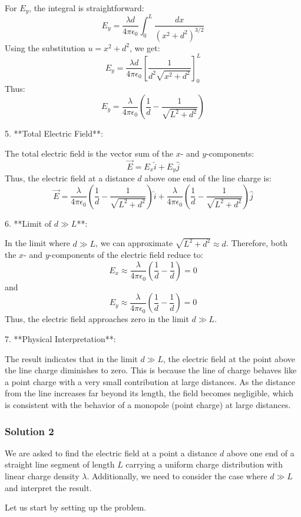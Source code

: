 \documentclass{article}
\begin{document}
For \( E_y \), the integral is straightforward:
\[
E_y = \frac{\lambda d}{4 \pi \epsilon_0} \int_0^L \frac{dx}{(x^2 + d^2)^{3/2}}
\]
Using the substitution \( u = x^2 + d^2 \), we get:
\[
E_y = \frac{\lambda d}{4 \pi \epsilon_0} \left[ \frac{1}{d^2 \sqrt{x^2 + d^2}} \right]_0^L
\]
Thus:
\[
E_y = \frac{\lambda}{4 \pi \epsilon_0} \left( \frac{1}{d} - \frac{1}{\sqrt{L^2 + d^2}} \right)
\]

5. **Total Electric Field**:

The total electric field is the vector sum of the \( x \)- and \( y \)-components:
\[
\vec{E} = E_x \hat{i} + E_y \hat{j}
\]
Thus, the electric field at a distance \( d \) above one end of the line charge is:
\[
\vec{E} = \frac{\lambda}{4 \pi \epsilon_0} \left( \frac{1}{d} - \frac{1}{\sqrt{L^2 + d^2}} \right) \hat{i} + \frac{\lambda}{4 \pi \epsilon_0} \left( \frac{1}{d} - \frac{1}{\sqrt{L^2 + d^2}} \right) \hat{j}
\]

6. **Limit of \( d \gg L \)**:

In the limit where \( d \gg L \), we can approximate \( \sqrt{L^2 + d^2} \approx d \). Therefore, both the \( x \)- and \( y \)-components of the electric field reduce to:
\[
E_x \approx \frac{\lambda}{4 \pi \epsilon_0} \left( \frac{1}{d} - \frac{1}{d} \right) = 0
\]
and
\[
E_y \approx \frac{\lambda}{4 \pi \epsilon_0} \left( \frac{1}{d} - \frac{1}{d} \right) = 0
\]
Thus, the electric field approaches zero in the limit \( d \gg L \).

7. **Physical Interpretation**:

The result indicates that in the limit \( d \gg L \), the electric field at the point above the line charge diminishes to zero. This is because the line of charge behaves like a point charge with a very small contribution at large distances. As the distance from the line increases far beyond its length, the field becomes negligible, which is consistent with the behavior of a monopole (point charge) at large distances.

\subsubsection{Solution 2}
We are asked to find the electric field at a point a distance \( d \) above one end of a straight line segment of length \( L \) carrying a uniform charge distribution with linear charge density \( \lambda \). Additionally, we need to consider the case where \( d \gg L \) and interpret the result.

Let us start by setting up the problem.
\end{document}
